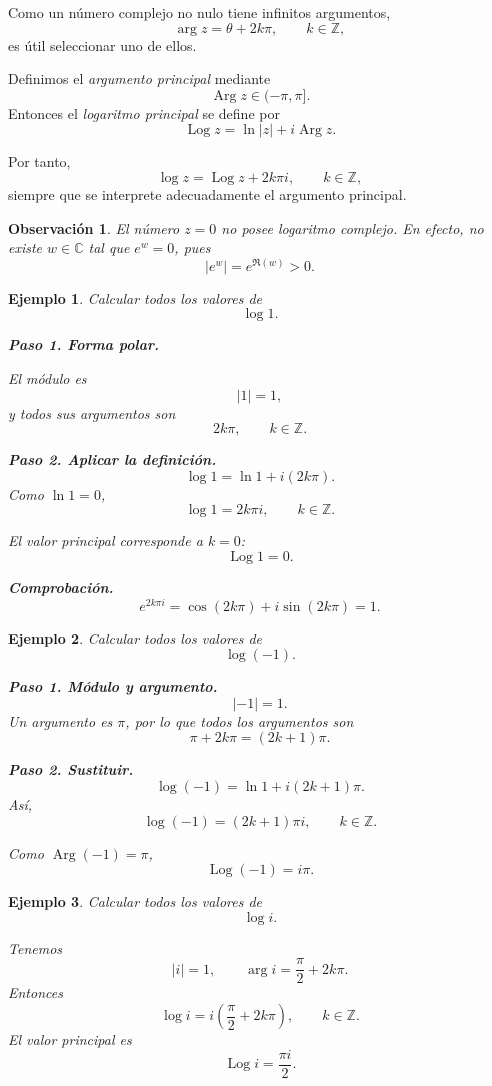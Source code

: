 \documentclass[12pt]{article}
\newtheorem{ejemplo}{Ejemplo}[section]
\newtheorem{Obs}{Observaci\'on}[section]
\begin{document}
Como un número complejo no nulo tiene infinitos argumentos,
\[
\arg z=\theta+2k\pi,\qquad k\in\mathbb Z,
\]
es útil seleccionar uno de ellos.

Definimos el \emph{argumento principal} mediante
\[
\operatorname{Arg}z\in(-\pi,\pi].
\]
Entonces el \emph{logaritmo principal} se define por
\[
\boxed{
\operatorname{Log}z=\ln|z|+i\operatorname{Arg}z.
}
\]

Por tanto,
\[
\log z
=
\operatorname{Log}z+2k\pi i,
\qquad k\in\mathbb Z,
\]
siempre que se interprete adecuadamente el argumento principal.

\begin{Obs}
El número $z=0$ no posee logaritmo complejo. En efecto, no existe
$w\in\mathbb C$ tal que $e^w=0$, pues
\[
|e^w|=e^{\Re(w)}>0.
\]
\end{Obs}

\begin{ejemplo}
Calcular todos los valores de
\[
\log 1.
\]

\textbf{Paso 1. Forma polar.}

El módulo es
\[
|1|=1,
\]
y todos sus argumentos son
\[
2k\pi,\qquad k\in\mathbb Z.
\]

\textbf{Paso 2. Aplicar la definición.}
\[
\log1=\ln1+i(2k\pi).
\]
Como $\ln1=0$,
\[
\boxed{
\log1=2k\pi i,\qquad k\in\mathbb Z.
}
\]

El valor principal corresponde a $k=0$:
\[
\boxed{\operatorname{Log}1=0.}
\]

\textbf{Comprobación.}
\[
e^{2k\pi i}
=\cos(2k\pi)+i\sin(2k\pi)
=1.
\]
\end{ejemplo}

\begin{ejemplo}
Calcular todos los valores de
\[
\log(-1).
\]

\textbf{Paso 1. Módulo y argumento.}
\[
|-1|=1.
\]
Un argumento es $\pi$, por lo que todos los argumentos son
\[
\pi+2k\pi=(2k+1)\pi.
\]

\textbf{Paso 2. Sustituir.}
\[
\log(-1)
=\ln1+i(2k+1)\pi.
\]
Así,
\[
\boxed{
\log(-1)=(2k+1)\pi i,\qquad k\in\mathbb Z.
}
\]

Como $\operatorname{Arg}(-1)=\pi$,
\[
\boxed{\operatorname{Log}(-1)=i\pi.}
\]
\end{ejemplo}

\begin{ejemplo}
Calcular todos los valores de
\[
\log i.
\]

Tenemos
\[
|i|=1,\qquad
\arg i=\frac{\pi}{2}+2k\pi.
\]
Entonces
\[
\boxed{
\log i=i\left(\frac{\pi}{2}+2k\pi\right),
\qquad k\in\mathbb Z.
}
\]
El valor principal es
\[
\boxed{\operatorname{Log}i=\frac{\pi i}{2}.}
\]
\end{ejemplo}
\end{document}
